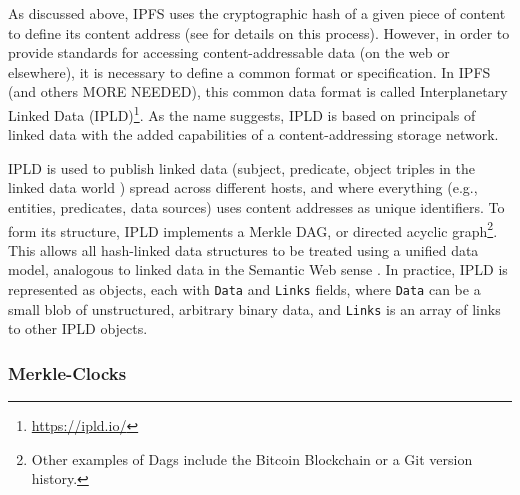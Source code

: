 \documentclass{textile}
\begin{document}
As discussed above, IPFS uses the cryptographic hash of a given piece of content to define its content address (see \cite{benetIPFSContentAddressed2014} for details on this process). However, in order to provide standards for accessing content-addressable data (on the web or elsewhere), it is necessary to define a common format or specification. In IPFS (and others \cite[e.g.,]{protocollabsFilecoinDecentralizedStorage2017} MORE NEEDED), this common data format is called Interplanetary Linked Data (IPLD)\footnote{\url{https://ipld.io/}}. As the name suggests, IPLD is based on principals of linked data \cite{berners-leeLinkedData2009,bizerLinkedDataStory2011} with the added capabilities of a content-addressing storage network. 

IPLD is used to publish linked data (subject, predicate, object triples in the linked data world \cite{heathLinkedDataEvolving2011}) spread across different hosts, and where everything (e.g., entities, predicates, data sources) uses content addresses as unique identifiers. To form its structure, IPLD implements a Merkle DAG, or directed acyclic graph\footnote{Other examples of Dags include the Bitcoin Blockchain or a Git version history.}. This allows all hash-linked data structures to be treated using a unified data model, analogous to linked data in the Semantic Web sense \cite{brendanobrienDeterministicQueryingDistributed2017}. In practice, IPLD is represented as objects, each with \texttt{Data} and \texttt{Links} fields, where \texttt{Data} can be a small blob of unstructured, arbitrary binary data, and \texttt{Links} is an array of links to other IPLD objects. 

\subsubsection{Merkle-Clocks} \label{sec:merkleclocks}
\end{document}
